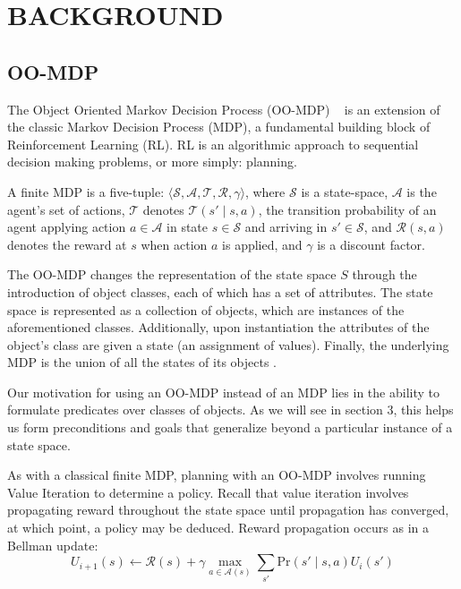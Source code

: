 \documentclass[]{article}
\begin{document}
\section{BACKGROUND}

\subsection{OO-MDP}

The Object Oriented Markov Decision Process (OO-MDP) ~\citep{diuk08} is an extension of the classic Markov Decision Process (MDP), a fundamental building block of Reinforcement Learning (RL). RL is an algorithmic approach to sequential decision making problems, or more simply: planning.

A finite MDP is a five-tuple: $\langle \mathcal{S}, \mathcal{A}, \mathcal{T}, \mathcal{R}, \gamma \rangle$, where $\mathcal{S}$ is a state-space, $\mathcal{A}$ is the agent's set of actions, $\mathcal{T}$ denotes $\mathcal{T}(s' \mid s,a)$, the transition probability of an agent applying action $a \in \mathcal{A}$ in state $s \in \mathcal{S}$ and arriving in $s' \in \mathcal{S}$, and $\mathcal{R}(s,a)$ denotes the reward at $s$ when action $a$ is applied, and $\gamma$ is a discount factor.

The OO-MDP changes the representation of the state space $S$ through the introduction of object classes, each of which has a set of attributes. The state space is represented as a collection of objects, which are instances of the aforementioned classes. Additionally, upon instantiation the attributes of the object's class are given a state (an assignment of values). Finally, the underlying MDP is the union of all the states of its objects \citep{diuk08}.

Our motivation for using an OO-MDP instead of an MDP lies in the ability to formulate predicates over classes of objects. As we will see in section 3, this helps us form preconditions and goals that generalize beyond a particular instance of a state space.

As with a classical finite MDP, planning with an OO-MDP involves running Value Iteration to determine a policy. Recall that value iteration involves propagating reward throughout the state space until propagation has converged, at which point, a policy may be deduced. Reward propagation occurs as in a Bellman update:
\begin{equation}
U_{i+1}(s) \leftarrow \mathcal{R}(s) + \gamma \max_{a \in \mathcal{A}(s)} \sum_{s'} \text{Pr}(s' \mid s, a)U_i(s')
\end{equation}
\end{document}
